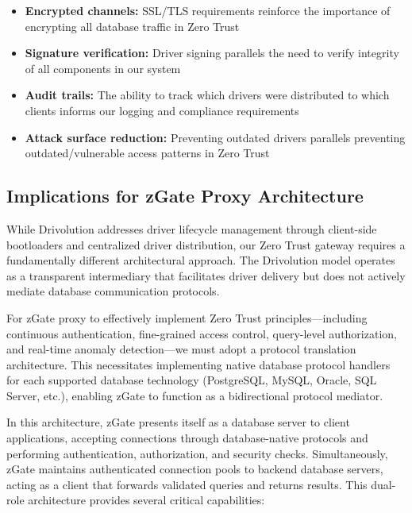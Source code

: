 \begin{itemize}
    \item \textbf{Encrypted channels:} SSL/TLS requirements reinforce the importance of encrypting all database traffic in Zero Trust
    \item \textbf{Signature verification:} Driver signing parallels the need to verify integrity of all components in our system
    \item \textbf{Audit trails:} The ability to track which drivers were distributed to which clients informs our logging and compliance requirements
    \item \textbf{Attack surface reduction:} Preventing outdated drivers parallels preventing outdated/vulnerable access patterns in Zero Trust
\end{itemize}

\subsection{Implications for zGate Proxy Architecture}

While Drivolution addresses driver lifecycle management through client-side bootloaders and centralized driver distribution, our Zero Trust gateway requires a fundamentally different architectural approach. The Drivolution model operates as a transparent intermediary that facilitates driver delivery but does not actively mediate database communication protocols.

For zGate proxy to effectively implement Zero Trust principles—including continuous authentication, fine-grained access control, query-level authorization, and real-time anomaly detection—we must adopt a protocol translation architecture. This necessitates implementing native database protocol handlers for each supported database technology (PostgreSQL, MySQL, Oracle, SQL Server, etc.), enabling zGate to function as a bidirectional protocol mediator.

In this architecture, zGate presents itself as a database server to client applications, accepting connections through database-native protocols and performing authentication, authorization, and security checks. Simultaneously, zGate maintains authenticated connection pools to backend database servers, acting as a client that forwards validated queries and returns results. This dual-role architecture provides several critical capabilities:

